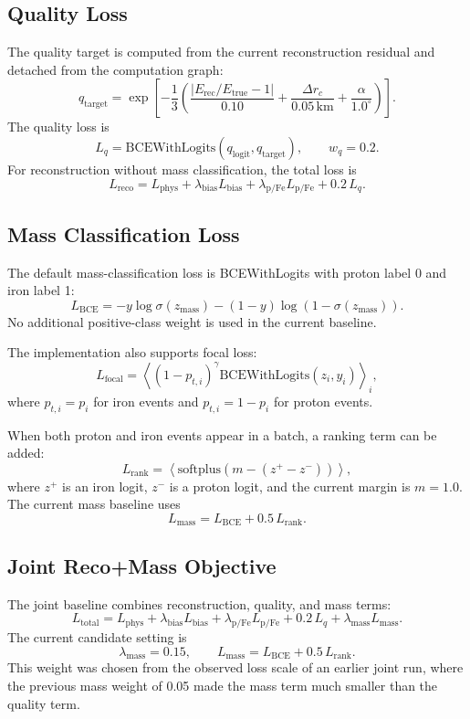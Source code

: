 \documentclass[a4paper,10pt]{article}
\begin{document}
\subsection{Quality Loss}

The quality target is computed from the current reconstruction residual and detached from the computation graph:
\[
  q_{\mathrm{target}}=
  \exp\left[-\frac{1}{3}\left(
  \frac{|E_{\mathrm{rec}}/E_{\mathrm{true}}-1|}{0.10}
  +\frac{\Delta r_c}{0.05\,\mathrm{km}}
  +\frac{\alpha}{1.0^\circ}
  \right)\right].
\]
The quality loss is
\[
  L_q=\mathrm{BCEWithLogits}(q_{\mathrm{logit}},q_{\mathrm{target}}),
  \qquad w_q=0.2.
\]
For reconstruction without mass classification, the total loss is
\[
  L_{\mathrm{reco}}
  =
  L_{\mathrm{phys}}
  +\lambda_{\mathrm{bias}}L_{\mathrm{bias}}
  +\lambda_{\mathrm{p/Fe}}L_{\mathrm{p/Fe}}
  +0.2\,L_q.
\]

\subsection{Mass Classification Loss}

The default mass-classification loss is BCEWithLogits with proton label 0 and iron label 1:
\[
  L_{\mathrm{BCE}}=
  -y\log\sigma(z_{\mathrm{mass}})
  -(1-y)\log(1-\sigma(z_{\mathrm{mass}})).
\]
No additional positive-class weight is used in the current baseline.

The implementation also supports focal loss:
\[
  L_{\mathrm{focal}}=
  \left\langle
  (1-p_{t,i})^\gamma
  \mathrm{BCEWithLogits}(z_i,y_i)
  \right\rangle_i,
\]
where $p_{t,i}=p_i$ for iron events and $p_{t,i}=1-p_i$ for proton events.

When both proton and iron events appear in a batch, a ranking term can be added:
\[
  L_{\mathrm{rank}}=
  \left\langle
  \mathrm{softplus}\left(m-(z^+-z^-)\right)
  \right\rangle,
\]
where $z^+$ is an iron logit, $z^-$ is a proton logit, and the current margin is $m=1.0$.
The current mass baseline uses
\[
  L_{\mathrm{mass}}=L_{\mathrm{BCE}}+0.5\,L_{\mathrm{rank}}.
\]

\subsection{Joint Reco+Mass Objective}

The joint baseline combines reconstruction, quality, and mass terms:
\[
  L_{\mathrm{total}}
  =
  L_{\mathrm{phys}}
  +\lambda_{\mathrm{bias}}L_{\mathrm{bias}}
  +\lambda_{\mathrm{p/Fe}}L_{\mathrm{p/Fe}}
  +0.2\,L_q
  +\lambda_{\mathrm{mass}} L_{\mathrm{mass}}.
\]
The current candidate setting is
\[
  \lambda_{\mathrm{mass}}=0.15,\qquad
  L_{\mathrm{mass}}=L_{\mathrm{BCE}}+0.5\,L_{\mathrm{rank}}.
\]
This weight was chosen from the observed loss scale of an earlier joint run, where the previous mass weight of 0.05 made the mass term much smaller than the quality term.
\end{document}
